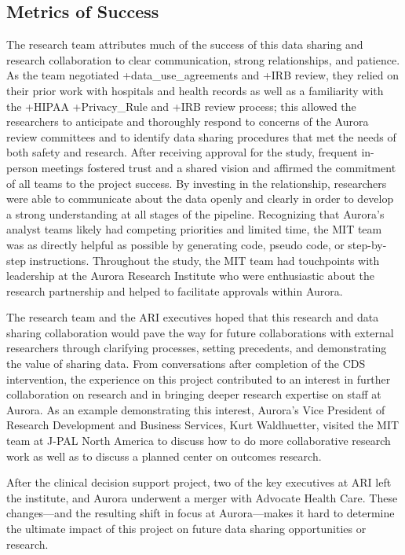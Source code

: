 \documentclass[
]{book}
\begin{document}
\hypertarget{metrics-of-success-4}{%
\subsection{Metrics of Success}\label{metrics-of-success-4}}

The research team attributes much of the success of this data sharing and research collaboration to clear communication, strong relationships, and patience. As the team negotiated +data\_use\_agreements\textbar{} and +IRB\textbar{} review, they relied on their prior work with hospitals and health records as well as a familiarity with the +HIPAA\textbar{} +Privacy\_Rule\textbar{} and +IRB\textbar{} review process; this allowed the researchers to anticipate and thoroughly respond to concerns of the Aurora review committees and to identify data sharing procedures that met the needs of both safety and research. After receiving approval for the study, frequent in-person meetings fostered trust and a shared vision and affirmed the commitment of all teams to the project success. By investing in the relationship, researchers were able to communicate about the data openly and clearly in order to develop a strong understanding at all stages of the pipeline. Recognizing that Aurora's analyst teams likely had competing priorities and limited time, the MIT team was as directly helpful as possible by generating code, pseudo code, or step-by-step instructions. Throughout the study, the MIT team had touchpoints with leadership at the Aurora Research Institute who were enthusiastic about the research partnership and helped to facilitate approvals within Aurora.

The research team and the ARI executives hoped that this research and data sharing collaboration would pave the way for future collaborations with external researchers through clarifying processes, setting precedents, and demonstrating the value of sharing data. From conversations after completion of the CDS intervention, the experience on this project contributed to an interest in further collaboration on research and in bringing deeper research expertise on staff at Aurora. As an example demonstrating this interest, Aurora's Vice President of Research Development and Business Services, Kurt Waldhuetter, visited the MIT team at J-PAL North America to discuss how to do more collaborative research work as well as to discuss a planned center on outcomes research.

After the clinical decision support project, two of the key executives at ARI left the institute, and Aurora underwent a merger with Advocate Health Care. These changes---and the resulting shift in focus at Aurora---makes it hard to determine the ultimate impact of this project on future data sharing opportunities or research.
\end{document}
